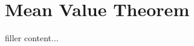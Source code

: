 \documentclass[../../templates/section]{subfiles}
\begin{document}
\section{Mean Value Theorem}\label{sec:mean-value-theorem}

filler content...
\end{document}
